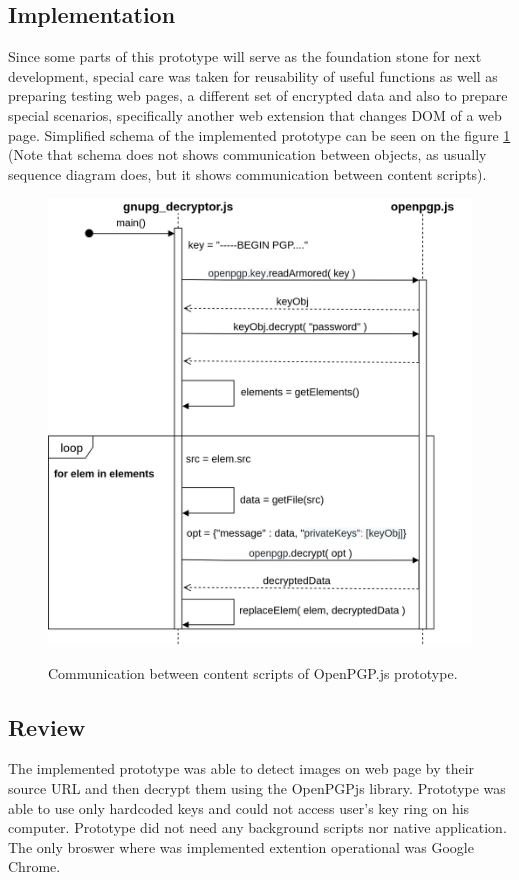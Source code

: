 \subsection{Implementation}
Since some parts of this prototype will serve as the foundation stone for next development, special care was taken for reusability of useful functions as well as preparing testing web pages, a different set of encrypted data and also to prepare special scenarios, specifically another web extension that changes DOM of a web page. Simplified schema of the implemented prototype can be seen on the figure \ref{img:openpgp-sequence} (Note that schema does not shows communication between objects, as usually sequence diagram does, but it shows communication between content scripts).
\begin{figure}[H]
    \begin{center}
        \label{img:openpgp-sequence}
        \includegraphics[width=1.0\textwidth]{obrazky-figures/openpgp-sequence.png}
        \caption{Communication between content scripts of OpenPGP.js prototype.}
    \end{center}
\end{figure}


\subsection{Review}
The implemented prototype was able to detect images on web page by their source URL and then decrypt them using the OpenPGPjs library. Prototype was able to use only hardcoded keys and could not access user's key ring on his computer. Prototype did not need any background scripts nor native application. The only broswer where was implemented extention operational was Google Chrome.

